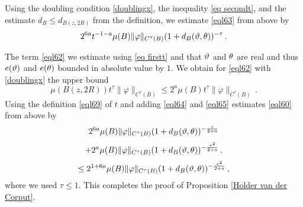 {Using   the doubling condition \eqref{doublingx},
the inequality \eqref{eq secondt}, and the estimate
$d_B\le d_{B(z,2R)}$ from the definition,
we estimate \eqref{eql63} from above by
\begin{equation}\label{eql64}
       2^{6a}t^{-1-a} \mu(B) \|{\varphi}\|_{C^\tau(B)}
       (1 + d_{B}(\vartheta,\theta))^{-\tau}  \, .
 \end{equation}

The term \eqref{eql62} we estimate using
\eqref{eq firstt} and that
$\vartheta$ and $\theta$ are real and thus $e(\vartheta)$ and
$e(\theta)$ bounded in absolute value by $1$.
We obtain for \eqref{eql62} with \eqref{doublingx}
the upper bound
  \begin{equation}\label{eql65}
      \mu(B(z,2R)) t^{\tau} \|\varphi\|_{C^\tau(B)}
      \le  2^a \mu(B) t^{\tau} \|\varphi\|_{C^\tau(B)}
      \,.
 \end{equation}
Using the definition \eqref{eql69} of $t$ and adding
\eqref{eql64} and \eqref{eql65} estimates
\eqref{eql60} from above by
\begin{equation}
       2^{6a} \mu(B) \|{\varphi}\|_{C^\tau(B)}
       (1 + d_{B}(\vartheta,\theta))^{-\frac{\tau}{2+a}}
       \end{equation}
\begin{equation} +
        2^a \mu(B) \|{\varphi}\|_{C^\tau(B)}
       (1 + d_{B}(\vartheta,\theta))^{-\frac{\tau^2}{2+a}}\, .
 \end{equation}
\begin{equation}\label{eql66}
      \le  2^{1+6a} \mu(B) \|{\varphi}\|_{C^\tau(B)}
       (1 + d_{B}(\vartheta,\theta))^{-\frac{\tau^2}{2+a}}  \, ,
 \end{equation}
where we used $\tau\le 1$.
This completes the proof of Proposition \ref{Holder van der Corput}.

}
